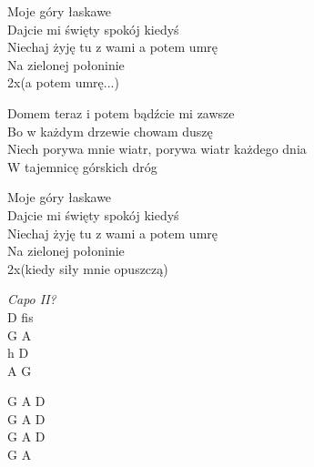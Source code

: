 \begin{text}
    \chordfill
    Moje góry łaskawe\\
    Dajcie mi święty spokój kiedyś\\
    Niechaj żyję tu z wami a potem umrę\\
    Na zielonej połoninie\\
    2x(a potem umrę...)

    Domem teraz i potem bądźcie mi zawsze\\
    Bo w każdym drzewie chowam duszę\\
    Niech porywa mnie wiatr, porywa wiatr każdego dnia\\
    W tajemnicę górskich dróg

    Moje góry łaskawe\\
    Dajcie mi święty spokój kiedyś\\
    Niechaj żyję tu z wami a potem umrę\\
    Na zielonej połoninie\\
    2x(kiedy siły mnie opuszczą)
\end{text}
\begin{chord}
    \textit{Capo II?}\\
    D fis\\
    G A\\
    h D\\
    A G

    \hfill\break
    G A D\\
    G A D\\
    G A D\\
    G A
\end{chord}